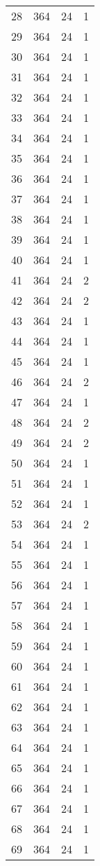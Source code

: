 \begin{longtable}[!]{c|ccc}
	28	& 364	& 24	& 1	\\
	29	& 364	& 24	& 1	\\
	30	& 364	& 24	& 1	\\
	31	& 364	& 24	& 1	\\
	32	& 364	& 24	& 1	\\
	33	& 364	& 24	& 1	\\
	34	& 364	& 24	& 1	\\
	35	& 364	& 24	& 1	\\
	36	& 364	& 24	& 1	\\
	37	& 364	& 24	& 1	\\
	38	& 364	& 24	& 1	\\
	39	& 364	& 24	& 1	\\
	40	& 364	& 24	& 1	\\
	41	& 364	& 24	& 2	\\
	42	& 364	& 24	& 2	\\
	43	& 364	& 24	& 1	\\
	44	& 364	& 24	& 1	\\
	45	& 364	& 24	& 1	\\
	46	& 364	& 24	& 2	\\
	47	& 364	& 24	& 1	\\
	48	& 364	& 24	& 2	\\
	49	& 364	& 24	& 2	\\
	50	& 364	& 24	& 1	\\
	51	& 364	& 24	& 1	\\
	52	& 364	& 24	& 1	\\
	53	& 364	& 24	& 2	\\
	54	& 364	& 24	& 1	\\
	55	& 364	& 24	& 1	\\
	56	& 364	& 24	& 1	\\
	57	& 364	& 24	& 1	\\
	58	& 364	& 24	& 1	\\
	59	& 364	& 24	& 1	\\
	60	& 364	& 24	& 1	\\
	61	& 364	& 24	& 1	\\
	62	& 364	& 24	& 1	\\
	63	& 364	& 24	& 1	\\
	64	& 364	& 24	& 1	\\
	65	& 364	& 24	& 1	\\
	66	& 364	& 24	& 1	\\
	67	& 364	& 24	& 1	\\
	68	& 364	& 24	& 1	\\
	69	& 364	& 24	& 1	\\

\end{longtable}
